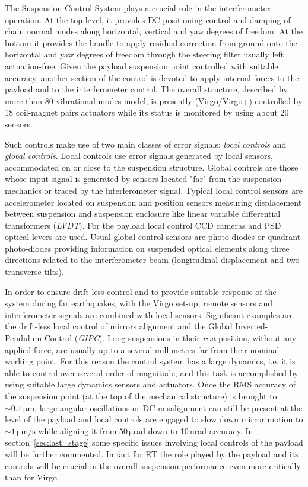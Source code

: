 The Suspension Control System plays a crucial role in the interferometer operation. At the top level, it provides DC positioning control and damping of chain normal modes along horizontal, vertical and yaw degrees of freedom. At the bottom it provides the handle to apply residual correction from ground onto the horizontal and yaw degrees of freedom through the steering filter usually left actuation-free. Given the payload suspension point controlled with suitable accuracy, another section of the control is devoted to apply internal forces to the payload and to the interferometer control. The overall structure, described by more than 80 vibrational modes model, is presently (Virgo/Virgo+) controlled by 18 coil-magnet pairs actuators while its status is monitored by using about 20 sensors.

Such controls make use of two main classes of error signals: \emph{local controls} and \emph{global controls}. Local controls use error signals generated by local sensors, accommodated on or close to the suspension structure. Global controls are those whose input signal is generated by sensors located "far" from the suspension mechanics or traced by the interferometer signal. Typical local control sensors are accelerometer located on suspension and position sensors measuring displacement between suspension and suspension enclosure like linear variable differential transformers (\emph{LVDT}). For the payload local control CCD cameras and PSD optical levers are used. Usual global control sensors are photo-diodes or quadrant photo-diodes providing information on suspended optical elements along three directions related to the interferometer beam (longitudinal displacement and two transverse tilts).

In order to ensure drift-less control and to provide suitable response of the system during far earthquakes, with the Virgo set-up, remote sensors and interferometer signals are combined with local sensors. Significant examples are the drift-less local control of mirrors alignment and the Global Inverted-Pendulum Control (\emph{GIPC}). Long suspensions in their \emph{rest} position, without any applied force, are usually up to a several millimetres far from their nominal working point. For this reason the control system has a large dynamics, i.e. it  is able to control over several order of magnitude, and this task is accomplished by using suitable large dynamics sensors and actuators. Once the RMS accuracy of the suspension point (at the top of the mechanical structure) is brought to $\sim 0.1\,\mathrm{\mu m}$, large angular oscillations or DC misalignment can still be present at the level of the payload and local controls are engaged to slow down mirror motion to $\sim 1\,\mathrm{\mu m /s}$ while aligning it from $50\,\mathrm{\mu\text{rad}}$ down to 10\,nrad accuracy. 
In section~\ref{sec:last_stage} some specific issues involving local controls of the payload will be further commented. In fact for ET the role played by the payload and its controls will be crucial in the overall suspension performance even more critically than for Virgo.

